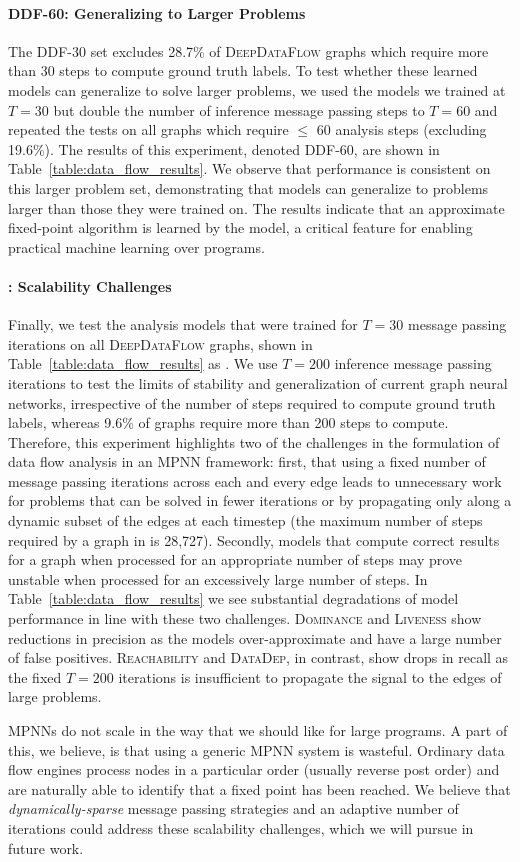 \paragraph{DDF-60: Generalizing to Larger Problems} The DDF-30 set excludes
28.7\% of \textsc{DeepDataFlow} graphs which require more than 30 steps to
compute ground truth labels. To test whether these learned models can generalize
to solve larger problems, we used the models we trained at $T=30$ but double the
number of inference message passing steps to $T=60$ and repeated the tests on
all graphs which require $\le$ 60 analysis steps (excluding 19.6\%). The results
of this experiment, denoted DDF-60, are shown in
Table~\ref{table:data_flow_results}. We observe that performance is consistent
on this larger problem set, demonstrating that \programl models can generalize
to problems larger than those they were trained on. The results indicate that an
approximate fixed-point algorithm is learned by the model, a critical feature
for enabling practical machine learning over programs.


\paragraph{\ddfinf{}: Scalability Challenges} Finally, we test the analysis
models that were trained for $T=30$ message passing iterations on all
\textsc{DeepDataFlow} graphs, shown in Table~\ref{table:data_flow_results} as
\ddfinf{}. We use $T=200$ inference message passing iterations to test the
limits of stability and generalization of current graph neural networks,
irrespective of the number of steps required to compute ground truth labels,
whereas 9.6\% of \ddfinf{} graphs require more than 200 steps to compute.
Therefore, this experiment highlights two of the challenges in the formulation
of data flow analysis in an MPNN framework: first, that using a fixed number of
message passing iterations across each and every edge leads to unnecessary work
for problems that can be solved in fewer iterations or by propagating only along
a dynamic subset of the edges at each timestep (the maximum number of steps
required by a graph in \ddfinf{} is 28,727). Secondly, models that compute
correct results for a graph when processed for an appropriate number of steps
may prove unstable when processed for an excessively large number of steps. In
Table~\ref{table:data_flow_results} we see substantial degradations of model
performance in line with these two challenges. \textsc{Dominance} and
\textsc{Liveness} show reductions in precision as the models over-approximate
and have a large number of false positives. \textsc{Reachability} and
\textsc{DataDep}, in contrast, show drops in recall as the fixed $T=200$
iterations is insufficient to propagate the signal to the edges of large
problems.

MPNNs do not scale in the way that we should like for large programs. A part of
this, we believe, is that using a generic MPNN system is wasteful. Ordinary data
flow engines process nodes in a particular order (usually reverse post order)
and are naturally able to identify that a fixed point has been reached. We
believe that \emph{dynamically-sparse} message passing strategies and an
adaptive number of iterations could address these scalability challenges, which
we will pursue in future work.
